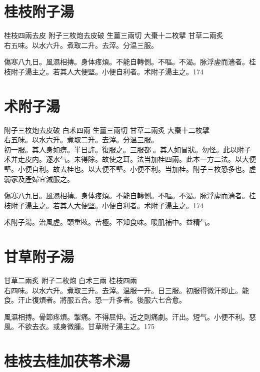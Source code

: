 \section{桂枝附子湯}

桂枝{\scriptsize 四兩去皮} 附子{\scriptsize 三枚炮去皮破} 生薑{\scriptsize 三兩切} 大棗{\scriptsize 十二枚擘} 甘草{\scriptsize 二兩炙}\\
右五味。以水六升。煮取二升。去滓。分温三服。

傷寒八九日。風濕相摶。身体疼煩。不能自轉側。不嘔。不渴。脉浮虗而濇者。桂枝附子湯主之。若其人大便堅。小便自利者。术附子湯主之。174

\section{术附子湯}

附子{\scriptsize 三枚炮去皮破} 白术{\scriptsize 四兩} 生薑{\scriptsize 三兩切} 甘草{\scriptsize 二兩炙} 大棗{\scriptsize 十二枚擘}\\
右五味。以水六升。煮取二升。去滓。分温三服。\\
初一服。其人身如痹。半日許。復服之。三服都{\sungtpii 𥁞}。其人如冒狀。勿怪。此以附子术并走皮内。逐水气。未得除。故使之耳。法当加桂四兩。此本一方二法。以大便堅。小便自利。故去桂也。以大便不堅。小便不利。当加桂。附子三枚恐多也。虗弱家及產婦宜減服之。

傷寒八九日。風濕相摶。身体疼煩。不能自轉側。不嘔。不渴。脉浮虗而濇者。桂枝附子湯主之。若其人大便堅。小便自利者。术附子湯主之。174

术附子湯。治風虗。頭重眩。苦極。不知食味。暖肌補中。益精气。

\section{甘草附子湯}

甘草{\scriptsize 二兩炙} 附子{\scriptsize 二枚炮} 白术{\scriptsize 三兩} 桂枝{\scriptsize 四兩}\\ 
右四味。以水六升。煮取三升。去滓。温服一升。日三服。初服得微汗即止。能食。汗止復煩者。將服五合。恐一升多者。後服六七合愈。

風濕相摶。骨節疼煩。掣痛。不得屈伸。近之則痛劇。汗出。短气。小便不利。惡風。不欲去衣。或身微腫。甘草附子湯主之。175

\section{桂枝去桂加茯苓术湯}

